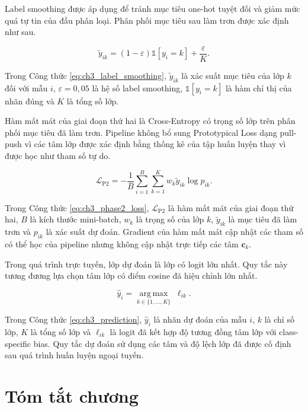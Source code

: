 Label smoothing được áp dụng để tránh mục tiêu one-hot tuyệt đối và giảm mức quá tự tin của đầu phân loại. Phân phối mục tiêu sau làm trơn được xác định như sau.

\begin{equation}\widetilde{y}_{ik}=\left(1-\varepsilon\right)\mathbb{1}\left[y_i=k\right]+\frac{\varepsilon}{K}.\label{eq:ch3_label_smoothing}\end{equation}

Trong Công thức \ref{eq:ch3_label_smoothing}, $\widetilde{y}_{ik}$ là xác suất mục tiêu của lớp $k$ đối với mẫu $i$, $\varepsilon=0{,}05$ là hệ số label smoothing, $\mathbb{1}[y_i=k]$ là hàm chỉ thị của nhãn đúng và $K$ là tổng số lớp.

Hàm mất mát của giai đoạn thứ hai là Cross-Entropy có trọng số lớp trên phân phối mục tiêu đã làm trơn. Pipeline không bổ sung Prototypical Loss dạng pull-push vì các tâm lớp được xác định bằng thống kê của tập huấn luyện thay vì được học như tham số tự do.

\begin{equation}\mathcal{L}_{\mathrm{P2}}=-\frac{1}{B}\sum_{i=1}^{B}\sum_{k=1}^{K}w_{k}\widetilde{y}_{ik}\log p_{ik}.\label{eq:ch3_phase2_loss}\end{equation}

Trong Công thức \ref{eq:ch3_phase2_loss}, $\mathcal{L}_{\mathrm{P2}}$ là hàm mất mát của giai đoạn thứ hai, $B$ là kích thước mini-batch, $w_k$ là trọng số của lớp $k$, $\widetilde{y}_{ik}$ là mục tiêu đã làm trơn và $p_{ik}$ là xác suất dự đoán. Gradient của hàm mất mát cập nhật các tham số có thể học của pipeline nhưng không cập nhật trực tiếp các tâm $\boldsymbol{c}_k$.

Trong quá trình trực tuyến, lớp dự đoán là lớp có logit lớn nhất. Quy tắc này tương đương lựa chọn tâm lớp có điểm cosine đã hiệu chỉnh lớn nhất.

\begin{equation}\widehat{y}_{i}=\underset{k\in\{1,\ldots,K\}}{\operatorname{arg\,max}}\;\ell_{ik}.\label{eq:ch3_prediction}\end{equation}

Trong Công thức \ref{eq:ch3_prediction}, $\widehat{y}_{i}$ là nhãn dự đoán của mẫu $i$, $k$ là chỉ số lớp, $K$ là tổng số lớp và $\ell_{ik}$ là logit đã kết hợp độ tương đồng tâm lớp với class-specific bias. Quy tắc dự đoán sử dụng các tâm và độ lệch lớp đã được cố định sau quá trình huấn luyện ngoại tuyến.

\section{Tóm tắt chương}


